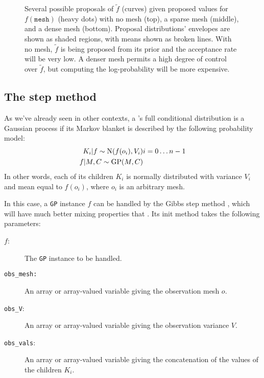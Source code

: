 \documentclass[]{manual}
\begin{document}
\begin{figure}
    \centering
    \caption{Several possible proposals of $\tilde f$ (curves) given proposed values for $f(\texttt{mesh})$ (heavy dots) with no mesh (top), a sparse mesh (middle), and a dense mesh (bottom). Proposal distributions' envelopes are shown as shaded regions, with means shown as broken lines. With no mesh, $\tilde f$ is being proposed from its prior and the acceptance rate will be very low. A denser mesh permits a high degree of control over $\tilde f$, but computing the log-probability will be more expensive.}
    \label{fig:meshpropose}
\end{figure}


\subsection{The  step method}
As we've already seen in other contexts, a 's full conditional distribution is a Gaussian process if its Markov blanket is described by the following probability model:
\begin{eqnarray*}
    K_i |f \sim \textup{N}(f(o_i), V_i) & i=0\ldots n-1\\
    f|M,C\sim\textup{GP}(M,C)
\end{eqnarray*}
In other words, each of its children $K_i$ is normally distributed with variance $V_i$ and mean equal to $f(o_i)$, where $o_i$ is an arbitrary mesh.

In this case, a \texttt{GP} instance $f$ can be handled by the Gibbs step method , which will have much better mixing properties that . Its init method takes the following parameters:
\begin{description}
    \item[$f$:] The \texttt{GP} instance to be handled.
    \item[\texttt{obs_mesh:}] An array or array-valued variable giving the observation mesh $o$.
    \item[\texttt{obs_V}:] An array or array-valued variable giving the observation variance $V$.
    \item[\texttt{obs_vals}:] An array or array-valued variable giving the concatenation of the values of the children $K_i$.
\end{description}
\end{document}
